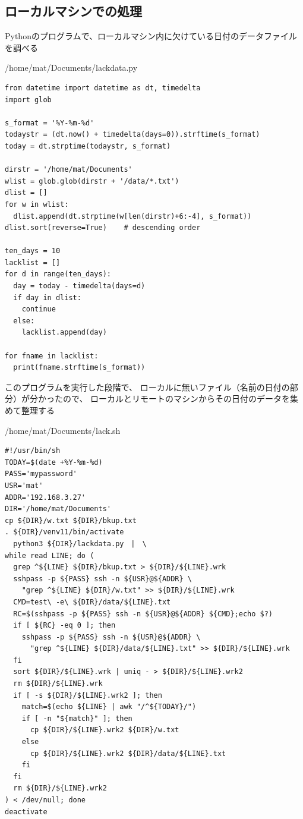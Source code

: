 \documentclass[12pt,a4paper,uplatex]{jsarticle}
\begin{document}
\newpage

\subsection{ローカルマシンでの処理}

Pythonのプログラムで、ローカルマシン内に欠けている日付のデータファイルを調べる

\begin{itembox}[l]{/home/mat/Documents/lackdata.py}
	\begin{verbatim}
from datetime import datetime as dt, timedelta
import glob

s_format = '%Y-%m-%d'
todaystr = (dt.now() + timedelta(days=0)).strftime(s_format)
today = dt.strptime(todaystr, s_format)

dirstr = '/home/mat/Documents'
wlist = glob.glob(dirstr + '/data/*.txt')
dlist = []
for w in wlist:
  dlist.append(dt.strptime(w[len(dirstr)+6:-4], s_format))
dlist.sort(reverse=True)	# descending order

ten_days = 10
lacklist = []
for d in range(ten_days):
  day = today - timedelta(days=d)
  if day in dlist:
    continue
  else:
    lacklist.append(day)

for fname in lacklist:
  print(fname.strftime(s_format))
	\end{verbatim}
\end{itembox}

このプログラムを実行した段階で、
ローカルに無いファイル（名前の日付の部分）が分かったので、
ローカルとリモートのマシンからその日付のデータを集めて整理する
\begin{itembox}[l]{/home/mat/Documents/lack.sh}
	\begin{verbatim}
#!/usr/bin/sh
TODAY=$(date +%Y-%m-%d)
PASS='mypassword'
USR='mat'
ADDR='192.168.3.27'
DIR='/home/mat/Documents'
cp ${DIR}/w.txt ${DIR}/bkup.txt
. ${DIR}/venv11/bin/activate
  python3 ${DIR}/lackdata.py　|　\
while read LINE; do (
  grep ^${LINE} ${DIR}/bkup.txt > ${DIR}/${LINE}.wrk
  sshpass -p ${PASS} ssh -n ${USR}@${ADDR} \
    "grep ^${LINE} ${DIR}/w.txt" >> ${DIR}/${LINE}.wrk
  CMD=test\ -e\ ${DIR}/data/${LINE}.txt
  RC=$(sshpass -p ${PASS} ssh -n ${USR}@${ADDR} ${CMD};echo $?)
  if [ ${RC} -eq 0 ]; then
    sshpass -p ${PASS} ssh -n ${USR}@${ADDR} \
      "grep ^${LINE} ${DIR}/data/${LINE}.txt" >> ${DIR}/${LINE}.wrk
  fi
  sort ${DIR}/${LINE}.wrk | uniq - > ${DIR}/${LINE}.wrk2
  rm ${DIR}/${LINE}.wrk
  if [ -s ${DIR}/${LINE}.wrk2 ]; then
    match=$(echo ${LINE} | awk "/^${TODAY}/")
    if [ -n "${match}" ]; then
      cp ${DIR}/${LINE}.wrk2 ${DIR}/w.txt
    else
      cp ${DIR}/${LINE}.wrk2 ${DIR}/data/${LINE}.txt
    fi
  fi
  rm ${DIR}/${LINE}.wrk2
) < /dev/null; done
deactivate
	\end{verbatim}
\end{itembox}
\end{document}
